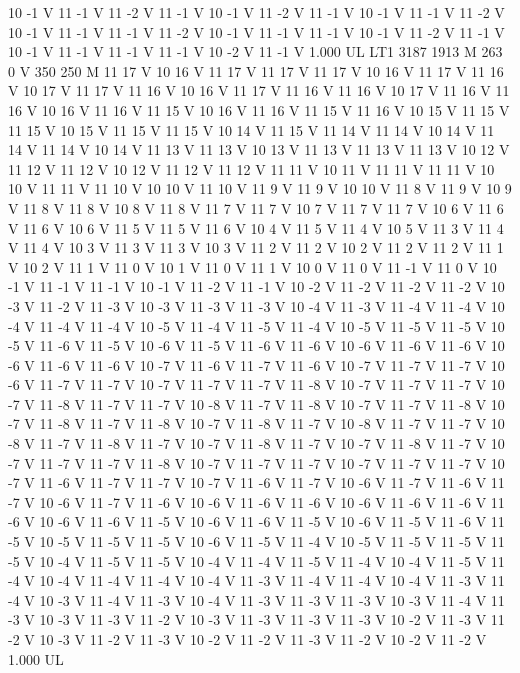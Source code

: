 {10 -1 V
11 -1 V
11 -2 V
11 -1 V
10 -1 V
11 -2 V
11 -1 V
10 -1 V
11 -1 V
11 -2 V
10 -1 V
11 -1 V
11 -1 V
11 -2 V
10 -1 V
11 -1 V
11 -1 V
10 -1 V
11 -2 V
11 -1 V
10 -1 V
11 -1 V
11 -1 V
11 -1 V
10 -2 V
11 -1 V
1.000 UL
LT1
3187 1913 M
263 0 V
350 250 M
11 17 V
10 16 V
11 17 V
11 17 V
11 17 V
10 16 V
11 17 V
11 16 V
10 17 V
11 17 V
11 16 V
10 16 V
11 17 V
11 16 V
11 16 V
10 17 V
11 16 V
11 16 V
10 16 V
11 16 V
11 15 V
10 16 V
11 16 V
11 15 V
11 16 V
10 15 V
11 15 V
11 15 V
10 15 V
11 15 V
11 15 V
10 14 V
11 15 V
11 14 V
11 14 V
10 14 V
11 14 V
11 14 V
10 14 V
11 13 V
11 13 V
10 13 V
11 13 V
11 13 V
11 13 V
10 12 V
11 12 V
11 12 V
10 12 V
11 12 V
11 12 V
11 11 V
10 11 V
11 11 V
11 11 V
10 10 V
11 11 V
11 10 V
10 10 V
11 10 V
11 9 V
11 9 V
10 10 V
11 8 V
11 9 V
10 9 V
11 8 V
11 8 V
10 8 V
11 8 V
11 7 V
11 7 V
10 7 V
11 7 V
11 7 V
10 6 V
11 6 V
11 6 V
10 6 V
11 5 V
11 5 V
11 6 V
10 4 V
11 5 V
11 4 V
10 5 V
11 3 V
11 4 V
11 4 V
10 3 V
11 3 V
11 3 V
10 3 V
11 2 V
11 2 V
10 2 V
11 2 V
11 2 V
11 1 V
10 2 V
11 1 V
11 0 V
10 1 V
11 0 V
11 1 V
10 0 V
11 0 V
11 -1 V
11 0 V
10 -1 V
11 -1 V
11 -1 V
10 -1 V
11 -2 V
11 -1 V
10 -2 V
11 -2 V
11 -2 V
11 -2 V
10 -3 V
11 -2 V
11 -3 V
10 -3 V
11 -3 V
11 -3 V
10 -4 V
11 -3 V
11 -4 V
11 -4 V
10 -4 V
11 -4 V
11 -4 V
10 -5 V
11 -4 V
11 -5 V
11 -4 V
10 -5 V
11 -5 V
11 -5 V
10 -5 V
11 -6 V
11 -5 V
10 -6 V
11 -5 V
11 -6 V
11 -6 V
10 -6 V
11 -6 V
11 -6 V
10 -6 V
11 -6 V
11 -6 V
10 -7 V
11 -6 V
11 -7 V
11 -6 V
10 -7 V
11 -7 V
11 -7 V
10 -6 V
11 -7 V
11 -7 V
10 -7 V
11 -7 V
11 -7 V
11 -8 V
10 -7 V
11 -7 V
11 -7 V
10 -7 V
11 -8 V
11 -7 V
11 -7 V
10 -8 V
11 -7 V
11 -8 V
10 -7 V
11 -7 V
11 -8 V
10 -7 V
11 -8 V
11 -7 V
11 -8 V
10 -7 V
11 -8 V
11 -7 V
10 -8 V
11 -7 V
11 -7 V
10 -8 V
11 -7 V
11 -8 V
11 -7 V
10 -7 V
11 -8 V
11 -7 V
10 -7 V
11 -8 V
11 -7 V
10 -7 V
11 -7 V
11 -7 V
11 -8 V
10 -7 V
11 -7 V
11 -7 V
10 -7 V
11 -7 V
11 -7 V
10 -7 V
11 -6 V
11 -7 V
11 -7 V
10 -7 V
11 -6 V
11 -7 V
10 -6 V
11 -7 V
11 -6 V
11 -7 V
10 -6 V
11 -7 V
11 -6 V
10 -6 V
11 -6 V
11 -6 V
10 -6 V
11 -6 V
11 -6 V
11 -6 V
10 -6 V
11 -6 V
11 -5 V
10 -6 V
11 -6 V
11 -5 V
10 -6 V
11 -5 V
11 -6 V
11 -5 V
10 -5 V
11 -5 V
11 -5 V
10 -6 V
11 -5 V
11 -4 V
10 -5 V
11 -5 V
11 -5 V
11 -5 V
10 -4 V
11 -5 V
11 -5 V
10 -4 V
11 -4 V
11 -5 V
11 -4 V
10 -4 V
11 -5 V
11 -4 V
10 -4 V
11 -4 V
11 -4 V
10 -4 V
11 -3 V
11 -4 V
11 -4 V
10 -4 V
11 -3 V
11 -4 V
10 -3 V
11 -4 V
11 -3 V
10 -4 V
11 -3 V
11 -3 V
11 -3 V
10 -3 V
11 -4 V
11 -3 V
10 -3 V
11 -3 V
11 -2 V
10 -3 V
11 -3 V
11 -3 V
11 -3 V
10 -2 V
11 -3 V
11 -2 V
10 -3 V
11 -2 V
11 -3 V
10 -2 V
11 -2 V
11 -3 V
11 -2 V
10 -2 V
11 -2 V
1.000 UL
}
